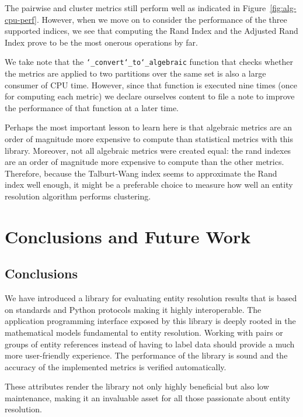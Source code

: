 \documentclass[a4paper,twoside]{article}
\begin{document}
    The pairwise and cluster metrics still perform well as indicated in
    Figure~\ref{fig:alg-cpu-perf}.
    However, when we move on to consider the performance of the three supported
    indices, we see that computing the Rand Index and the Adjusted Rand Index
    prove to be the most onerous operations by far.

    We take note that the \texttt{\char`_convert\char`_to\char`_algebraic}
    function that checks whether the metrics are applied to two partitions over
    the same set is also a large consumer of CPU time.
    However, since that function is executed nine times (once for computing each
    metric) we declare ourselves content to file a note to improve the
    performance of that function at a later time.

    Perhaps the most important lesson to learn here is that algebraic metrics
    are an order of magnitude more expensive to compute than statistical
    metrics with this library.
    Moreover, not all algebraic metrics were created equal: the rand indexes
    are an order of magnitude more expensive to compute than the other metrics.
    Therefore, because the Talburt-Wang index seems to approximate the Rand
    index well enough, it might be a preferable choice to measure how well an
    entity resolution algorithm performs clustering.

    \section{Conclusions and Future Work}\label{sec:conclusions_and_future}

    \subsection{Conclusions}

    We have introduced a library for evaluating entity resolution results that
    is based on standards and Python protocols making it highly interoperable.
    The application programming interface exposed by this library is deeply
    rooted in the mathematical models fundamental to entity resolution.
    Working with pairs or groups of entity references instead of having to label
    data should provide a much more user-friendly experience.
    The performance of the library is sound and the accuracy of the implemented
    metrics is verified automatically.

    These attributes render the library not only highly beneficial but also low
    maintenance, making it an invaluable asset for all those passionate about
    entity resolution.
\end{document}
